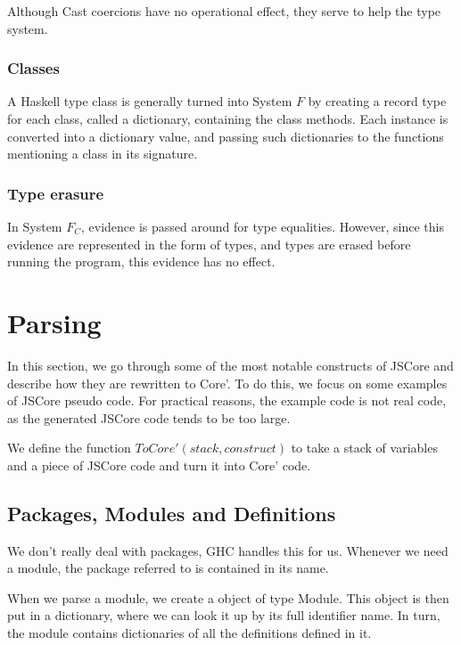 Although Cast coercions have no operational effect, they serve to help the
type system.

\subsubsection{Classes}
\label{subsec:classes}

A Haskell type class is generally turned into System $F$ by creating a 
record type for each class, called a dictionary, containing the class methods.
Each instance is converted into a dictionary value, and passing such 
dictionaries to the functions mentioning a class in its signature. 
\cite{sulzmann2007system}

\subsubsection{Type erasure}

In System $F_C$, evidence is passed around for type equalities. However,
since this evidence are represented in the form of types, and types are
erased before running the program, this evidence has no effect.
\cite{sulzmann2007system}


\section{Parsing}

In this section, we go through some of the most notable constructs of JSCore and
describe how they are rewritten to Core'. To do this, we focus on some examples of
JSCore pseudo code. For practical reasons, the example code is not real code, as the
generated JSCore code tends to be too large.

We define the function $ToCore'(stack, construct)$ to take a stack of variables and 
a piece of JSCore code and turn it into Core' code.


\subsection{Packages, Modules and Definitions}

We don't really deal with packages, GHC handles this for us. Whenever we
need a module, the package referred to is contained in its name.

When we parse a module, we create a object of type Module. This object is
then put in a dictionary, where we can look it up by its full identifier name.
In turn, the module contains dictionaries of all the definitions defined in it.

